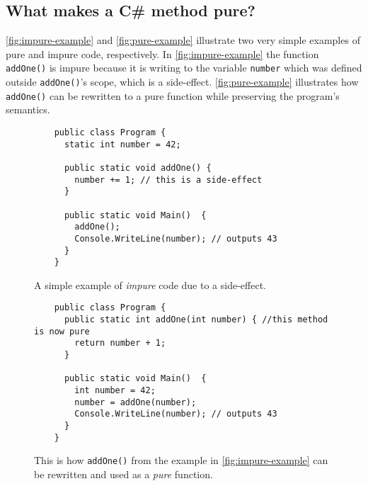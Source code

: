 \documentclass[a4paper,12pt]{article}
\begin{document}

\subsection{What makes a C\# method pure?} \label{sub:What makes a Cs program functional?}
\autoref{fig:impure-example} and \autoref{fig:pure-example} illustrate two very simple examples of pure and impure code, respectively. In \autoref{fig:impure-example} the function \texttt{addOne()} is impure because it is writing to the variable \texttt{number} which was defined outside \texttt{addOne()}'s scope, which is a side-effect. \autoref{fig:pure-example} illustrates how \texttt{addOne()} can be rewritten to a pure function while preserving the program's semantics.

\begin{figure}[H]
  \centering
  \begin{lstlisting}
    public class Program {
      static int number = 42;

      public static void addOne() {
        number += 1; // this is a side-effect
      }

      public static void Main()  {
        addOne();
        Console.WriteLine(number); // outputs 43
      }
    }
  \end{lstlisting}
  \caption{A simple example of \textit{impure} code due to a side-effect.}
  \label{fig:impure-example}
\end{figure}

\begin{figure}[H]
  \centering
  \begin{lstlisting}
    public class Program {
      public static int addOne(int number) { //this method is now pure
        return number + 1;
      }

      public static void Main()  {
        int number = 42;
        number = addOne(number);
        Console.WriteLine(number); // outputs 43
      }
    }
  \end{lstlisting}
  \caption{This is how \texttt{addOne()} from the example in \autoref{fig:impure-example} can be rewritten and used as a \textit{pure} function.}
  \label{fig:pure-example}
\end{figure}

\end{document}
